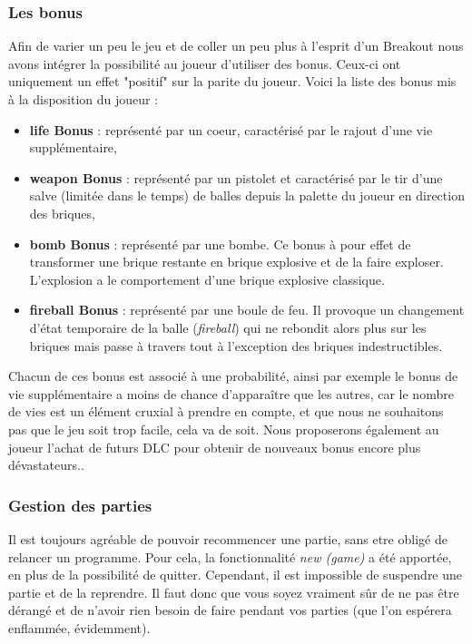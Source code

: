 \documentclass[a4paper,10pt]{article}
\begin{document}
    \subsubsection{Les bonus}
        Afin de varier un peu le jeu et de coller un peu plus à l'esprit d'un Breakout nous avons intégrer la possibilité au joueur
        d'utiliser des bonus. Ceux-ci ont uniquement un effet "positif" sur la parite du joueur. Voici la liste des bonus mis 
        à la disposition du joueur : 
        \begin{itemize}
            \item \textbf{life Bonus} : représenté par un coeur, caractérisé par le rajout d'une vie supplémentaire,
            \item \textbf{weapon Bonus} : représenté par un pistolet et caractérisé par le tir d'une salve (limitée dans le temps) de balles depuis
            la palette du joueur en direction des briques,
            \item \textbf{bomb Bonus} : représenté par une bombe. Ce bonus à pour effet de transformer une brique restante 
            en brique explosive et de la faire exploser. L'explosion a le comportement d'une brique explosive classique.
            \item \textbf{fireball Bonus} : représenté par une boule de feu. Il provoque un changement d'état temporaire de la balle (\textit{fireball}) 
            qui ne 	rebondit alors plus sur les briques mais passe à travers tout à l'exception des briques indestructibles.
        \end{itemize}

        Chacun de ces bonus est associé à une probabilité, ainsi  par exemple le bonus de vie supplémentaire a moins
        de chance d'apparaître que les autres, car le nombre de vies est un élément cruxial à prendre
        en compte, et que nous ne souhaitons pas que le jeu soit trop facile, cela va de soit.
        Nous proposerons également au joueur l'achat de futurs DLC pour obtenir de nouveaux bonus encore plus dévastateurs..

    \subsubsection{Gestion des parties}
        Il est toujours agréable de pouvoir recommencer une partie, sans etre obligé de relancer un
        programme. Pour cela, la fonctionnalité \textit{new (game)} a été apportée, en plus de la
        possibilité de quitter. Cependant, il est impossible de suspendre une partie et de la reprendre.
        Il faut donc que vous soyez vraiment sûr de ne pas être dérangé et de n'avoir rien besoin de faire pendant vos parties
        (que l'on espérera enflammée, évidemment).
\end{document}
